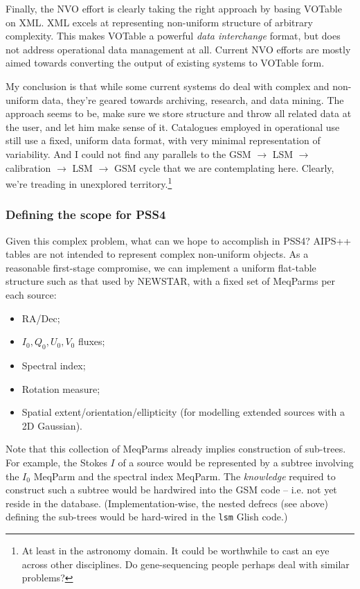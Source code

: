 \documentclass[10pt]{article}
\begin{document}
Finally, the NVO effort is clearly taking the right approach by basing VOTable
on XML. XML excels at representing non-uniform structure of arbitrary
complexity. This makes VOTable a powerful {\em data interchange} format, but
does not address operational data management at all. Current NVO efforts are
mostly aimed towards converting the output of existing systems to VOTable form.

My conclusion is that while some current systems do deal with complex and
non-uniform data, they're geared towards archiving, research, and data mining.
The approach seems to be, make sure we store structure and throw all related
data at the user, and let him make sense of it. Catalogues employed in
operational use still use a fixed, uniform data format, with very minimal
representation of variability. And I could not find any parallels to the GSM
$\rightarrow$ LSM $\rightarrow$ calibration $\rightarrow$ LSM $\rightarrow$ GSM
cycle that we are contemplating here. Clearly, we're treading in unexplored
territory.\footnote{At least in the astronomy domain. It could be worthwhile to
cast an eye across other disciplines. Do gene-sequencing people perhaps deal
with similar problems?}

\subsubsection{Defining the scope for PSS4 \label{pss4scope}}

Given this complex problem, what can we hope to accomplish in PSS4? AIPS++
tables are not intended to represent complex non-uniform objects. As a
reasonable first-stage compromise, we can implement a uniform flat-table
structure such as that used by NEWSTAR, with a fixed set of MeqParms per each
source: 

\begin{itemize}
\item RA/Dec;
\item $I_0,Q_0,U_0,V_0$ fluxes;
\item Spectral index;
\item Rotation measure;
\item Spatial extent/orientation/ellipticity (for modelling extended sources with a 
2D Gaussian).
\end{itemize}

Note that this collection of MeqParms already implies construction of
sub-trees. For example, the Stokes $I$ of a source would be represented by a
subtree involving the $I_0$ MeqParm and the spectral index MeqParm. The {\em
knowledge} required to construct such a subtree would be hardwired into the
GSM code -- i.e. not yet reside in the database. (Implementation-wise, the
nested defrecs (see above) defining the sub-trees would be hard-wired in the
{\tt lsm} Glish code.)
\end{document}
